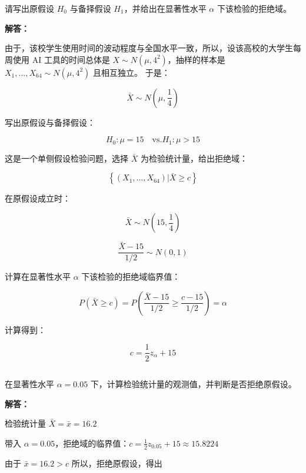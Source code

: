 \documentclass[12pt,a4paper]{article}
\begin{document}
请写出原假设 $H_0$ 与备择假设 $H_1$，并给出在显著性水平 $\alpha$ 下该检验的拒绝域。

\begin{answerbox}
\textbf{解答：}

由于，该校学生使用时间的波动程度与全国水平一致，所以，设该高校的大学生每周使用 AI 工具的时间总体是 $X \sim N\left(\mu, 4^2\right)$，抽样的样本是 $X_1, \ldots, X_{64} \sim N\left(\mu, 4^2\right)$ 且相互独立。
于是：

$$
\bar{X} \sim N\left(\mu, \frac{1}{4}\right)
$$

写出原假设与备择假设：

$$
H_0: \mu = 15 \quad \text{vs.} H_1: \mu > 15 
$$

这是一个单侧假设检验问题，选择 $\bar{X}$ 为检验统计量，给出拒绝域：

$$
\left\{(X_1, \ldots, X_{64}) | \bar{X} \geq c\right\}
$$

在原假设成立时：

$$
\bar{X} \sim N\left(15, \frac{1}{4}\right)
$$

$$
\frac{\bar{X}-15}{1/2} \sim N(0,1)
$$

计算在显著性水平 $\alpha$ 下该检验的拒绝域临界值：

$$
P\left(\bar{X} \geq c\right) = P\left(\frac{\bar{X}-15}{1/2} \geq \frac{c-15}{1/2}\right) = \alpha
$$

计算得到：

$$
c = \frac{1}{2} z_\alpha + 15
$$

\end{answerbox}

\subsection{}

在显著性水平 $\alpha=0.05$ 下，计算检验统计量的观测值，并判断是否拒绝原假设。

\begin{answerbox}
\textbf{解答：}

检验统计量 $\bar{X} = \bar{x} = 16.2$

带入 $\alpha = 0.05$，拒绝域的临界值：$c = \frac{1}{2} z_{0.05} + 15 \approx 15.8224$

由于 $\bar{x} = 16.2 > c$ 所以，拒绝原假设，得出
\end{answerbox}

\subsection{}
\end{document}
